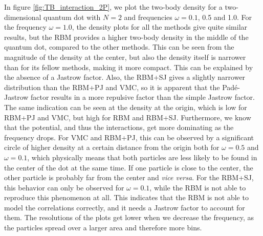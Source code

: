 In figure \eqref{fig:TB_interaction_2P}, we plot the two-body density for a two-dimensional quantum dot with $N=2$ and frequencies $\omega=0.1$, 0.5 and 1.0. For the frequency $\omega=1.0$, the density plots for all the methods give quite similar results, but the RBM provides a higher two-body density in the middle of the quantum dot, compared to the other methods. This can be seen from the magnitude of the density at the center, but also the density itself is narrower than for its fellow methods, making it more compact. This can be explained by the absence of a Jastrow factor. Also, the RBM+SJ gives a slightly narrower distribution than the RBM+PJ and VMC, so it is apparent that the Padé-Jastrow factor results in a more repulsive factor than the simple Jastrow factor. The same indication can be seen at the density at the origin, which is low for RBM+PJ and VMC, but high for RBM and RBM+SJ. Furthermore, we know that the potential, and thus the interactions, get more dominating as the frequency drops. For VMC and RBM+PJ, this can be observed by a significant circle of higher density at a certain distance from the origin both for $\omega=0.5$ and $\omega=0.1$, which physically means that both particles are less likely to be found in the center of the dot at the same time. If one particle is close to the center, the other particle is probably far from the center and \textit{vice versa}. For the RBM+SJ, this behavior can only be observed for $\omega=0.1$, while the RBM is not able to reproduce this phenomenon at all. This indicates that the RBM is not able to model the correlations correctly, and it needs a Jastrow factor to account for them. The resolutions of the plots get lower when we decrease the frequency, as the particles spread over a larger area and therefore more bins.

